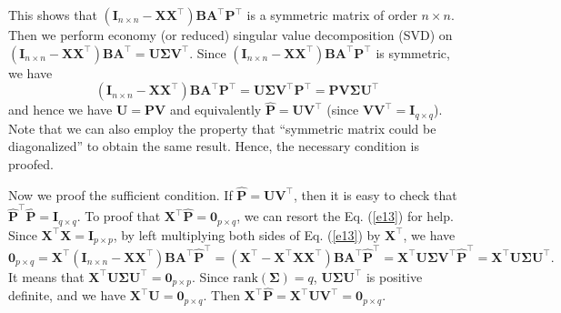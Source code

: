 \documentclass[titlepage,11pt,twoside]{article}
\begin{document}
This shows that $(\mathbf{I}_{n\times n}-\mathbf{X}\mathbf{X}^{\top})\mathbf{B}\mathbf{A}^{\top}\mathbf{P}^{\top}$ is a symmetric matrix of order $n\times n$. Then we perform economy (or reduced) singular value decomposition (SVD) on $(\mathbf{I}_{n\times n}-\mathbf{X}\mathbf{X}^{\top})\mathbf{B}\mathbf{A}^{\top}=\mathbf{U}\mathbf{\Sigma}\mathbf{V}^{\top}$.
Since $(\mathbf{I}_{n\times n}-\mathbf{X}\mathbf{X}^{\top})\mathbf{B}\mathbf{A}^{\top}\mathbf{P}^{\top}$ is symmetric, we have
\begin{equation}\label{e13}
(\mathbf{I}_{n\times n}-\mathbf{X}\mathbf{X}^{\top})\mathbf{B}\mathbf{A}^{\top}\mathbf{P}^{\top}
=
\mathbf{U}\mathbf{\Sigma}\mathbf{V}^{\top}\mathbf{P}^{\top}
=
\mathbf{P}\mathbf{V}\mathbf{\Sigma}\mathbf{U}^{\top}
\end{equation}
and hence we have $\mathbf{U}=\mathbf{P}\mathbf{V}$ and equivalently $\mathbf{\hat{P}}=\mathbf{U}\mathbf{V}^{\top}$ (since $\mathbf{V}\mathbf{V}^{\top}=\mathbf{I}_{q\times q}$). Note that we can also employ the property that ``symmetric matrix could be diagonalized'' to obtain the same result. Hence, the necessary condition is proofed. 

Now we proof the sufficient condition. If $\mathbf{\hat{P}}=\mathbf{U}\mathbf{V}^{\top}$, then it is easy to check that $\mathbf{\hat{P}}^{\top}\mathbf{\hat{P}}=\mathbf{I}_{q\times q}$. To proof that $\mathbf{X}^{\top}\mathbf{\hat{P}}=\mathbf{0}_{p\times q}$, we can resort the Eq. (\ref{e13}) for help. Since $\mathbf{X}^{\top}\mathbf{X}=\mathbf{I}_{p\times p}$, by left multiplying both sides of Eq. (\ref{e13}) by $\mathbf{X}^{\top}$, we have  
\begin{equation}
\mathbf{0}_{p\times q}
=
\mathbf{X}^{\top}(\mathbf{I}_{n\times n}-\mathbf{X}\mathbf{X}^{\top})\mathbf{B}\mathbf{A}^{\top}\mathbf{\hat{P}}^{\top}
=
(\mathbf{X}^{\top}-\mathbf{X}^{\top}\mathbf{X}\mathbf{X}^{\top})\mathbf{B}\mathbf{A}^{\top}\mathbf{\hat{P}}^{\top}
=
\mathbf{X}^{\top}\mathbf{U}\mathbf{\Sigma}\mathbf{V}^{\top}\mathbf{\hat{P}}^{\top}
=
\mathbf{X}^{\top}\mathbf{U}\mathbf{\Sigma}\mathbf{U}^{\top}
.
\end{equation}
It means that $\mathbf{X}^{\top}\mathbf{U}\mathbf{\Sigma}\mathbf{U}^{\top}=\mathbf{0}_{p\times p}$. Since $\text{rank}(\mathbf{\Sigma})=q$, $\mathbf{U}\mathbf{\Sigma}\mathbf{U}^{\top}$ is positive definite, and we have $\mathbf{X}^{\top}\mathbf{U}=\mathbf{0}_{p\times q}$. Then $\mathbf{X}^{\top}\mathbf{\hat{P}}=\mathbf{X}^{\top}\mathbf{U}\mathbf{V}^{\top}=\mathbf{0}_{p\times q}$.
\end{document}
